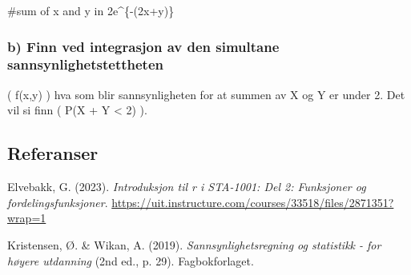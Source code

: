 \documentclass[
  12pt,
  a4paper,
  DIV=11,
  numbers=noendperiod]{scrartcl}
\newenvironment{Shaded}{\begin{snugshade}}{\end{snugshade}}
\newcommand{\CommentTok}[1]{\textcolor[rgb]{0.37,0.37,0.37}{#1}}
\newlength{\cslhangindent}
\newenvironment{CSLReferences}[2] %
 {\begin{list}{}{%
  \setlength{\itemindent}{0pt}
  \setlength{\leftmargin}{0pt}
  \setlength{\parsep}{0pt}
  \ifodd #1
   \setlength{\leftmargin}{\cslhangindent}
   \setlength{\itemindent}{-1\cslhangindent}
  \fi
  \setlength{\itemsep}{#2\baselineskip}}}
 {\end{list}}
\begin{document}
\begin{Shaded}
\begin{Highlighting}[]
\CommentTok{\#sum of x and y in 2e\^{}\{{-}(2x+y)\}}
\end{Highlighting}
\end{Shaded}

\subsubsection{b) Finn ved integrasjon av den simultane
sannsynlighetstettheten}\label{b-finn-ved-integrasjon-av-den-simultane-sannsynlighetstettheten}

( f(x,y) ) hva som blir sannsynligheten for at summen av X og Y er under
2. Det vil si finn ( P(X + Y \textless{} 2) ).

\clearpage

\subsection{Referanser}\label{referanser}

\label{refs}
\begin{CSLReferences}{1}{0}
Elvebakk, G. (2023). \emph{Introduksjon til r i STA-1001: Del 2:
Funksjoner og fordelingsfunksjoner}.
\url{https://uit.instructure.com/courses/33518/files/2871351?wrap=1}

Kristensen, Ø. \& Wikan, A. (2019). \emph{Sannsynlighetsregning og
statistikk - for høyere utdanning} (2nd ed., p. 29). Fagbokforlaget.

\end{CSLReferences}
\end{document}
